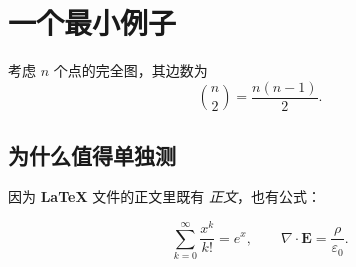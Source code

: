 \documentclass{article}
\begin{document}
\section{一个最小例子}

考虑 $n$ 个点的完全图，其边数为
\[
\binom{n}{2} = \frac{n(n-1)}{2}.
\]

\subsection{为什么值得单独测}

因为 \textbf{LaTeX} 文件的正文里既有 \emph{正文}，也有公式：

\[
\sum_{k=0}^{\infty} \frac{x^k}{k!} = e^{x}, \qquad
\nabla \cdot \mathbf{E} = \frac{\rho}{\varepsilon_0}.
\]
\end{document}
